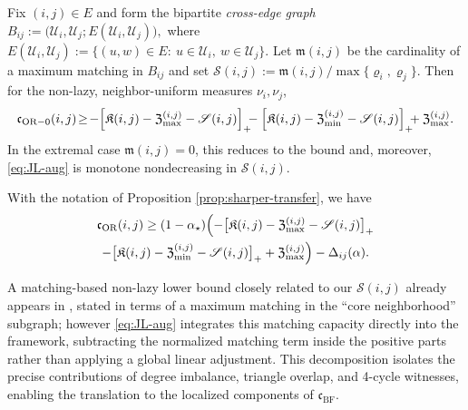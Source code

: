 \documentclass[twoside,11pt]{article}
\numberwithin{equation}{section}
\numberwithin{theorem}{section}
\numberwithin{example}{section}
\begin{document}
\begin{theorem}
\label{thm:JL-plus-squares}
Fix $(i,j)\!\in\! E$ and form the bipartite \emph{cross-edge graph} $
B_{ij}:=\bigl(\mathcal U_i, \mathcal U_j; E(\mathcal U_i,\mathcal U_j)\bigr),$ where $E(\mathcal U_i,\mathcal U_j):=\{(u,w)\in E:\ u\in\mathcal U_i,\ w\in\mathcal U_j\}.
$
Let $\mathfrak m(i,j)$ be the cardinality of a maximum matching in $B_{ij}$ and set
\(
\mathscr S(i,j):={\mathfrak m(i,j)}/{\max\{\varrho_i,\varrho_j\}}.
\)
Then for the non-lazy, neighbor-uniform measures $\nu_i,\nu_j$,
\begin{equation}
\label{eq:JL-aug}
\mathfrak c_{\mathrm{OR}-0}(i,j)\! \ge\!
-\Bigl[\mathfrak K(i,j)-\mathfrak Z_{\max}^{(i,j)}-\mathscr S(i,j)\Bigr]_+\!\!\!
-\Bigl[\mathfrak K(i,j)-\mathfrak Z_{\min}^{(i,j)}-\mathscr S(i,j)\Bigr]_+
\!\!\!+\mathfrak Z_{\max}^{(i,j)}.
\end{equation}
In the extremal case $\mathfrak m(i,j)=0$, this reduces to the \citet[Theorem 1, Equation (1.2)]{jost_clustering_2014} bound and, moreover, \eqref{eq:JL-aug} is monotone nondecreasing in $\mathscr S(i,j)$.
\end{theorem}

\begin{corollary}
\label{cor:JL-plus-squares-lazy}
With the notation of Proposition \ref{prop:sharper-transfer}, we have
\begin{multline}
\label{eq:cOR-tri-quad-bound}
\mathfrak c_{\mathrm{OR}}(i,j) \ge
(1-\alpha_\star)\Bigl(
-\bigl[\mathfrak K(i,j)-\mathfrak Z^{(i,j)}_{\max}-\mathscr S(i,j)\bigr]_+\\
-\bigl[\mathfrak K(i,j)-\mathfrak Z^{(i,j)}_{\min}-\mathscr S(i,j)\bigr]_+
+\mathfrak Z_{\max}^{(i,j)}
\Bigr) - \Delta_{ij}(\alpha).
\end{multline}
\end{corollary}

\begin{remark}
A matching-based non-lazy lower bound closely related to our $\mathscr S(i,j)$ already appears in \citet[Theorem~5.1]{bhattacharya_exact_2020}, stated in terms of a maximum matching in the ``core neighborhood'' subgraph; however \eqref{eq:JL-aug} integrates this matching capacity directly into the \citeauthor{jost_clustering_2014} framework, subtracting the normalized matching term inside the positive parts rather than applying a global linear adjustment. This decomposition isolates the precise contributions of degree imbalance, triangle overlap, and 4-cycle witnesses, enabling the translation to the localized components of $\mathfrak{c}_{\mathrm{BF}}$.
\end{remark}
\end{document}
